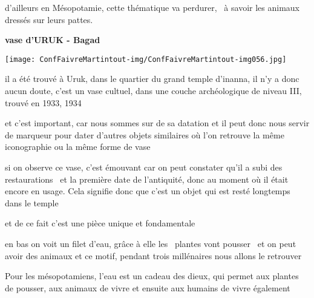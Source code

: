 \documentclass[a4paper]{article}
\begin{document}
{
d'ailleurs en Mésopotamie, cette thématique va perdurer, \ à savoir les
animaux dressés sur leurs pattes.}


\bigskip


\bigskip


\bigskip


\bigskip


\bigskip


\bigskip


\bigskip


\bigskip


\bigskip


\bigskip

{
\textbf{vase d'URUK - Bagad\ \ }}


\bigskip


\bigskip


\texttt{[image: ConfFaivreMartintout-img/ConfFaivreMartintout-img056.jpg]}



\bigskip


\bigskip


\bigskip

{
il a été trouvé à Uruk, dans le quartier du grand temple d'inanna, il
n'y a donc aucun doute, c'est un vase cultuel, dans une couche
archéologique de niveau III, trouvé en 1933, 1934}


\bigskip

{
et c'est important, car nous sommes sur de sa datation et il peut donc
nous servir de marqueur pour dater d'autres objets similaires où l'on
retrouve la même iconographie ou la même forme de vase}


\bigskip

{
si on observe ce vase, c'est émouvant car on peut constater qu'il a subi
des restaurations \ et la première date de l'antiquité, donc au moment
où il était encore en usage. Cela signifie donc que c'est un objet qui
est resté longtemps dans le temple}

{
et de ce fait c'est une pièce unique et fondamentale}


\bigskip

{
en bas on voit un filet d'eau, grâce à elle les \ plantes vont pousser
\ et on peut avoir des animaux et ce motif, pendant trois millénaires
nous allons le retrouver}

{
Pour les mésopotamiens, l'eau est un cadeau des dieux, qui permet aux
plantes de pousser, aux animaux de vivre et ensuite aux humains de
vivre également}
\end{document}
